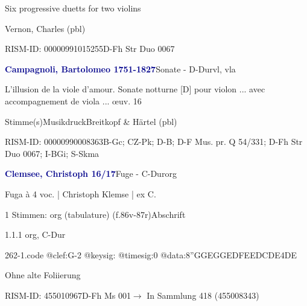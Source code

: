 \documentclass[twocolumn, 12pt]{book}
\begin{document}
\par \begin{itshape}Six progressive duetts for two violins\end{itshape} \newline Vernon, Charles  (pbl)
\par RISM-ID: 00000991015255\newline D-Fh  Str Duo 0067
\par \vspace{16pt} \textcolor{darkblue}{\textbf{Campagnoli, Bartolomeo  1751-1827}}\hfillplus{\textbf{[261]}}\newline Sonate - D-Dur\newline vl, vla
\par \begin{itshape}L'illusion de la viole d'amour. Sonate notturne [D] pour violon ... avec accompagnement de viola ... œuv. 16\end{itshape} 
\par \textcolor{darkblue}{}  Stimme(s)\newline Musikdruck\newline Breitkopf \& Härtel  (pbl)
\par RISM-ID: 00000990008363\newline B-Gc; CZ-Pk; D-B; D-F  Mus. pr. Q 54/331; D-Fh  Str Duo 0067; I-BGi; S-Skma
\par \vspace{16pt} \textcolor{darkblue}{\textbf{Clemsee, Christoph  16/17}}\hfillplus{\textbf{[262]}}\newline Fuge - C-Dur\newline org
\par \begin{itshape}[f.86v, at left:] Fuga à 4 voc. | Christoph Klemse | ex C.\end{itshape} 
\par \textcolor{darkblue}{}  1 Stimmen: org (tabulature)  (f.86v-87r)\newline Abschrift
\par 1.1.1  org, C-Dur  
\begin{filecontents*}{262-1.code}
@clef:G-2
@keysig:
@timesig:0
@data:{8''GGEG}{GEDF}{EEDC}{DE}4DE
\end{filecontents*}
\newline %
\par Ohne alte Foliierung
\par RISM-ID: 455010967\newline D-Fh  Ms 001\newline $\rightarrow$ In Sammlung 418 (455008343)
      
\end{document}
